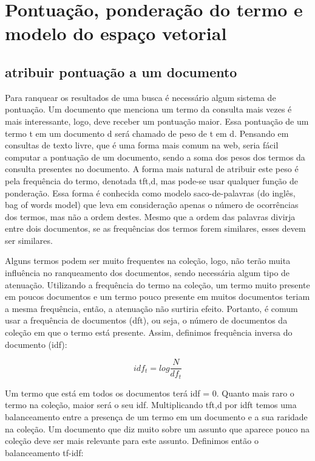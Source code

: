 \section{Pontuação, ponderação do termo e modelo do espaço vetorial}
\label{sec:espaco_vetorial}

\subsection{atribuir pontuação a um documento}

Para ranquear os resultados de uma busca é necessário algum sistema de pontuação. Um documento que menciona um termo da consulta mais vezes é mais interessante, logo, deve receber um pontuação maior. Essa pontuação de um termo t em um documento d será chamado de peso de t em d. Pensando em consultas de texto livre, que é uma forma mais comum na web, seria fácil computar a pontuação de um documento, sendo a soma dos pesos dos termos da consulta presentes no documento. A forma mais natural de atribuir este peso é pela frequência do termo, denotada tft,d, mas pode-se usar qualquer função de ponderação. Essa forma é conhecida como modelo saco-de-palavras (do inglês, bag of words model) que leva em consideração apenas o número de ocorrências dos termos, mas não a ordem destes. Mesmo que a ordem das palavras divirja entre dois documentos, se as frequências dos termos forem similares, esses devem ser similares.

Alguns termos podem ser muito frequentes na coleção, logo, não terão muita influência no ranqueamento dos documentos, sendo necessária algum tipo de atenuação. Utilizando a frequência do termo na coleção, um termo muito presente em poucos documentos e um termo pouco presente em muitos documentos teriam a mesma frequência, então, a atenuação não surtiria efeito. Portanto, é comum usar a frequência de documentos (dft), ou seja, o número de documentos da coleção em que o termo está presente. Assim, definimos frequência inversa do documento (idf):

$$idf_{t} = log \frac{N}{df_{t}}$$

Um termo que está em todos os documentos terá idf = 0. Quanto mais raro o termo na coleção, maior será o seu idf. Multiplicando tft,d por idft temos uma balanceamento entre a presença de um termo em um documento e a sua raridade na coleção. Um documento que diz muito sobre um assunto que aparece pouco na coleção deve ser mais relevante para este assunto. Definimos então o balanceamento tf-idf:

